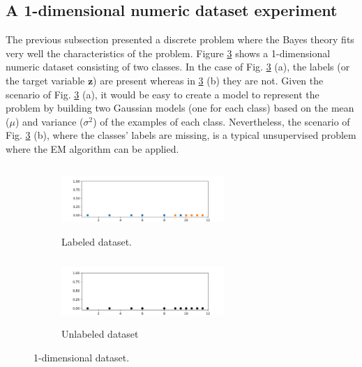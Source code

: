 
\subsection{A 1-dimensional numeric dataset experiment}

The previous subsection presented a discrete problem where the Bayes theory fits very well the characteristics of the problem. Figure \ref{fig:ds} shows a 1-dimensional numeric dataset consisting of two classes. In the case of Fig. \ref{fig:ds} (a), the labels (or the target variable $\mathbf{z}$) are present whereas in \ref{fig:ds} (b) they are not. Given the scenario of Fig. \ref{fig:ds} (a), it would be easy to create a model to represent the problem by building two Gaussian models (one for each class) based on the mean ($\mu$) and variance ($\sigma^{2}$) of the examples of each class. Nevertheless, the scenario of Fig. \ref{fig:ds} (b), where the classes' labels are missing, is a typical unsupervised problem where the EM algorithm can be applied. 

\begin{figure}
\centering
\begin{subfigure}{.5\textwidth}
  \centering
  \includegraphics[width=6.2cm,height=2.5cm]{figures/lab_dataset.png}
  \caption{Labeled dataset.}
  \label{fig:lab_ds}
\end{subfigure}%
\begin{subfigure}{.5\textwidth}
  \centering
  \includegraphics[width=6.2cm,height=2.5cm]{figures/unlab_dataset.png}
  \caption{Unlabeled dataset}
  \label{fig:unlab_ds}
\end{subfigure}
\caption{1-dimensional dataset.}
\label{fig:ds}
\end{figure}

